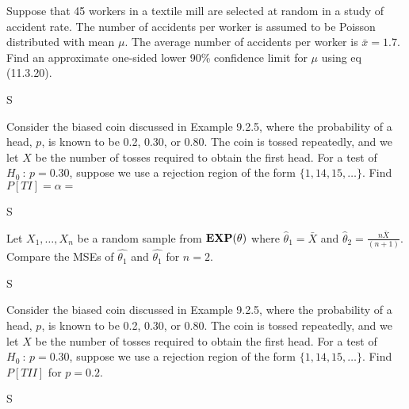 \documentclass[answers]{exam}
\begin{document}
\begin{questions}
\question 
Suppose that 45 workers in a textile mill are selected at random in a study of accident rate. 
The number of accidents per worker is assumed to be Poisson distributed with mean \(\mu\). 
The average number of accidents per worker is \(\bar{x}=1.7\).
Find an approximate one-sided lower 90\% confidence limit for \(\mu\) 
using eq (11.3.20).
\begin{solution}
	S
\end{solution}

\question 
Consider the biased coin discussed in Example 9.2.5, where the probability of a head, 
\(p\), is known to be 0.2, 0.30, or 0.80. 
The coin is tossed repeatedly, 
and we let \(X\) be the number of tosses required to obtain the first head. 
For a test of \(H_0\ :\,p=0.30\), suppose we use a rejection region of the form
\(\{1,14,15,\ldots\}\). Find \(P\left[TI\right]=\alpha=\)
\begin{solution}
	S
\end{solution}

\question 
Let \(X_1,\ldots,X_n\) be a random sample from \(\text{\textbf{EXP}}(\theta)\) where \(\hat{\theta}_1=\bar{X}\) and \(\hat{\theta}_2=\frac{n\bar{X}}{(n+1)}\). 
Compare the MSEs of \(\hat{\theta_1}\) and \(\hat{\theta_1}\) for \(n=2\).
\begin{solution}
	S
\end{solution}

\question 
Consider the biased coin discussed in Example 9.2.5, where the probability of a
head, \(p\), is known to be 0.2, 0.30, or 0.80. 
The coin is tossed repeatedly, and we let \(X\) be the number of tosses 
required to obtain the first head. For a test of \(H_0\ :\,p=0.30\), 
suppose we use a rejection region of the form \(\{1,14,15,\ldots\}\). 
Find \(P\left[TII\right]\) for \(p=0.2\).
\begin{solution}
	S
\end{solution}

\end{questions}
\end{document}
